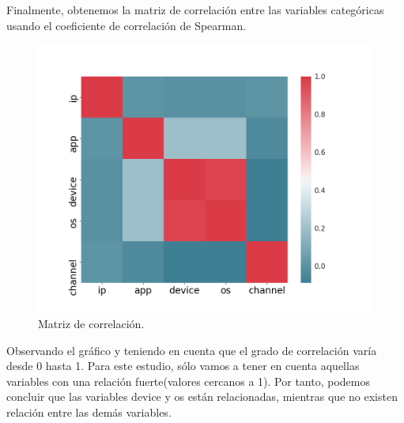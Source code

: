 Finalmente, obtenemos la matriz de correlación entre las variables categóricas usando el coeficiente de correlación de Spearman. 
\begin{figure}[H]
	\centering
	\includegraphics[scale=0.5]{img/correlation.png}
	\caption{Matriz de correlación.}
\end{figure}
Observando el gráfico y teniendo en cuenta que el grado de correlación varía desde 0 hasta 1. Para este estudio, sólo vamos a tener en cuenta aquellas variables con una relación fuerte(valores cercanos a 1). Por tanto, podemos concluir que las variables device y os están relacionadas, mientras que no existen relación entre las demás variables.